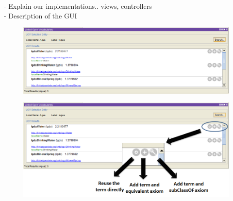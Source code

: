 - Explain our implementations.. views, controllers\\

- Description of the GUI

\begin{figure}
\center
\includegraphics[scale=0.5]{img/LOVmockup.png}
\end{figure}


\begin{figure}
\center
\includegraphics[scale=0.5]{img/LOVoptions.png}
\end{figure}


